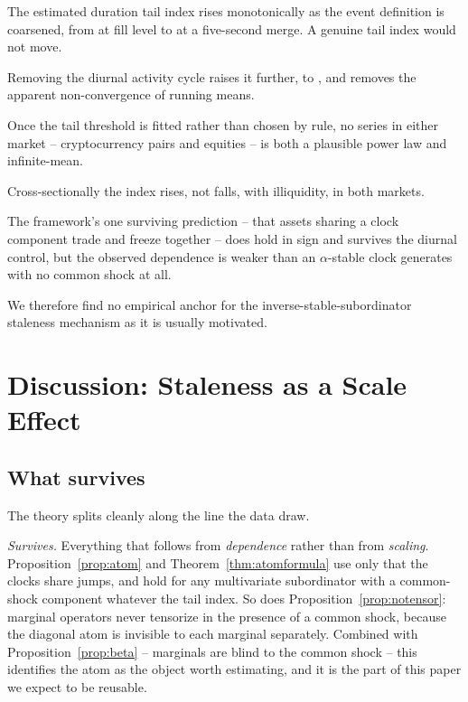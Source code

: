 \documentclass{ws-ijtaf}
\begin{document}
\begin{arabiclist}
\item The estimated duration tail index rises monotonically as the event
definition is coarsened, from \cryptoAlphaFillMed{} at fill level to
\cryptoAlphaWcMed{} at a five-second merge. A genuine tail index would not move.
\item Removing the diurnal activity cycle raises it further, to
\cryptoAlphaDeseasMed{}, and removes the apparent non-convergence of running
means.
\item Once the tail threshold is fitted rather than chosen by rule, no series in
either market -- \cryptoOrderTested{} cryptocurrency pairs and \hoseTested{}
equities -- is both a plausible power law and infinite-mean.
\item Cross-sectionally the index rises, not falls, with illiquidity, in both
markets.
\item The framework's one surviving prediction -- that assets sharing a clock
component trade and freeze together -- does hold in sign and survives the
diurnal control, but the observed dependence is weaker than an $\alpha$-stable
clock generates with no common shock at all.
\end{arabiclist}

We therefore find no empirical anchor for the inverse-stable-subordinator
staleness mechanism as it is usually motivated.

\section{Discussion: Staleness as a Scale Effect}\label{sec:discussion}

\subsection{What survives}

The theory splits cleanly along the line the data draw.

\emph{Survives.} Everything that follows from \emph{dependence} rather than from
\emph{scaling}. Proposition~\ref{prop:atom} and Theorem~\ref{thm:atomformula}
use only that the clocks share jumps, and hold for any multivariate subordinator
with a common-shock component whatever the tail index. So does
Proposition~\ref{prop:notensor}: marginal operators never tensorize in the
presence of a common shock, because the diagonal atom is invisible to each
marginal separately. Combined with Proposition~\ref{prop:beta} -- marginals are
blind to the common shock -- this identifies the atom as the object worth
estimating, and it is the part of this paper we expect to be reusable.
\end{document}
